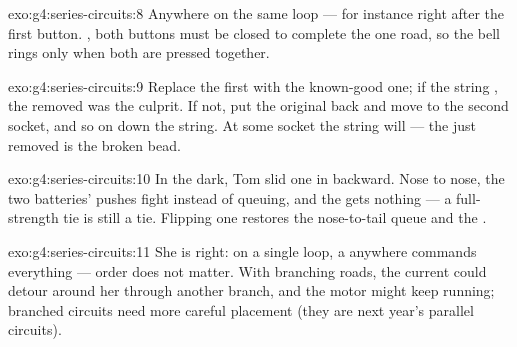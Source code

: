 \begin{solution}{exo:g4:series-circuits:8}
Anywhere on the same loop --- for instance right after the first
button. , both buttons must be closed to complete the one
road, so the bell rings only when both are pressed together.
\end{solution}

\begin{solution}{exo:g4:series-circuits:9}
Replace the first  with the known-good one; if the string
, the removed  was the culprit. If not, put the original
back and move to the second socket, and so on down the string. At
some socket the string will  --- the  just removed is the
broken bead.
\end{solution}

\begin{solution}{exo:g4:series-circuits:10}
In the dark, Tom slid one  in backward. Nose to nose, the two
batteries' pushes fight instead of queuing, and the  gets
nothing --- a full-strength tie is still a tie. Flipping one 
restores the nose-to-tail queue and the .
\end{solution}

\begin{solution}{exo:g4:series-circuits:11}
She is right: on a single loop, a  anywhere commands
everything --- order does not matter. With branching roads, the
current could detour around her  through another branch, and
the motor might keep running; branched circuits need more careful
 placement (they are next year's parallel circuits).
\end{solution}

